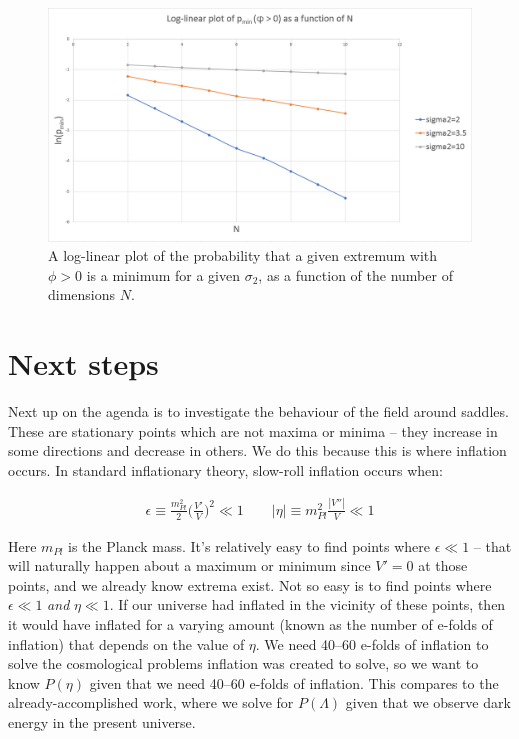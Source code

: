 \documentclass[12pt]{article}
\begin{document}
\begin{figure} 
  \centering
  \includegraphics[width=\linewidth]{Log-linear.png}
  \caption{A log-linear plot of the probability that a given extremum with $\phi > 0$ is a minimum for a given $\sigma_2$, as a function of the number of dimensions $N$.}
  \label{Log-Linear}
\end{figure}

\section{Next steps}
Next up on the agenda is to investigate the behaviour of the field around saddles. These are stationary points which are not maxima or minima -- they increase in some directions and decrease in others. We do this because this is where inflation occurs. In standard inflationary theory, slow-roll inflation occurs when:

\begin{equation}
	\begin{split}
	\epsilon \equiv \frac{m_{Pl}^2}{2}\bigg(\frac{V'}{V}\bigg)^2 \ll 1
	\qquad
	|\eta| \equiv m_{Pl}^2 \frac{|V''|}{V} \ll 1
	\end{split}
\end{equation}

Here $m_{Pl}$ is the Planck mass. It's relatively easy to find points where $\epsilon \ll 1$ -- that will naturally happen about a maximum or minimum since $V'=0$ at those points, and we already know extrema exist. Not so easy is to find points where $\epsilon \ll 1$ \emph{and} $\eta \ll 1$. If our universe had inflated in the vicinity of these points, then it would have inflated for a varying amount (known as the number of e-folds of inflation) that depends on the value of $\eta$. We need 40--60 e-folds of inflation to solve the cosmological problems inflation was created to solve, \cite{Baumann} so we want to know $P(\eta)$ given that we need 40--60 e-folds of inflation. This compares to the already-accomplished work, where we solve for $P(\Lambda)$ given that we observe dark energy in the present universe.
\end{document}
